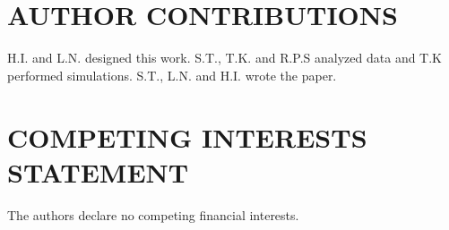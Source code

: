 \documentclass[twoside,twocolumn, letterpaper]{article}
\renewcommand{\baselinestretch}{1}
\begin{document}
\section*{AUTHOR CONTRIBUTIONS}
H.I. and L.N. designed this work. S.T., T.K. and R.P.S analyzed data and T.K performed simulations. S.T., L.N. and H.I. wrote the paper.

\section*{COMPETING INTERESTS STATEMENT}
The authors declare no competing financial interests.

{\scriptsize \sf
\renewcommand{\baselinestretch}{2.0}


}
\end{document}
